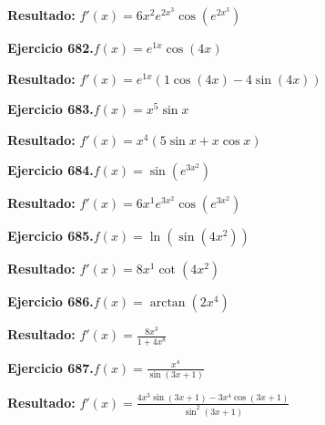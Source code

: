 \documentclass[10pt,a4paper]{article}
\begin{document}
\begin{solbox}
\textbf{Resultado:} \(\displaystyle f'(x) = 6x^{2}e^{2x^{3}}\cos(e^{2x^{3}})\)
\end{solbox}

\newpage
\begin{ejbox}
\textbf{Ejercicio 682.}\quad $f(x) = e^{1x} \cos(4x)$
\end{ejbox}

\begin{solbox}
\textbf{Resultado:} \(\displaystyle f'(x) = e^{1x}(1\cos(4x) - 4\sin(4x))\)
\end{solbox}

\begin{ejbox}
\textbf{Ejercicio 683.}\quad $f(x) = x^{5} \sin x$
\end{ejbox}

\begin{solbox}
\textbf{Resultado:} \(\displaystyle f'(x) = x^{4}(5\sin x + x\cos x)\)
\end{solbox}

\begin{ejbox}
\textbf{Ejercicio 684.}\quad $f(x) = \sin(e^{3x^{2}})$
\end{ejbox}

\begin{solbox}
\textbf{Resultado:} \(\displaystyle f'(x) = 6x^{1}e^{3x^{2}}\cos(e^{3x^{2}})\)
\end{solbox}

\newpage
\begin{ejbox}
\textbf{Ejercicio 685.}\quad $f(x) = \ln(\sin(4x^{2}))$
\end{ejbox}

\begin{solbox}
\textbf{Resultado:} \(\displaystyle f'(x) = 8x^{1}\cot(4x^{2})\)
\end{solbox}

\begin{ejbox}
\textbf{Ejercicio 686.}\quad $f(x) = \arctan(2x^{4})$
\end{ejbox}

\begin{solbox}
\textbf{Resultado:} \(\displaystyle f'(x) = \frac{8x^{3}}{1+4x^{8}}\)
\end{solbox}

\begin{ejbox}
\textbf{Ejercicio 687.}\quad $f(x) = \frac{x^{4}}{\sin(3x +1)}$
\end{ejbox}

\begin{solbox}
\textbf{Resultado:} \(\displaystyle f'(x) = \frac{4x^{3}\sin(3x +1) - 3x^{4}\cos(3x +1)}{\sin^2(3x +1)}\)
\end{solbox}
\end{document}

